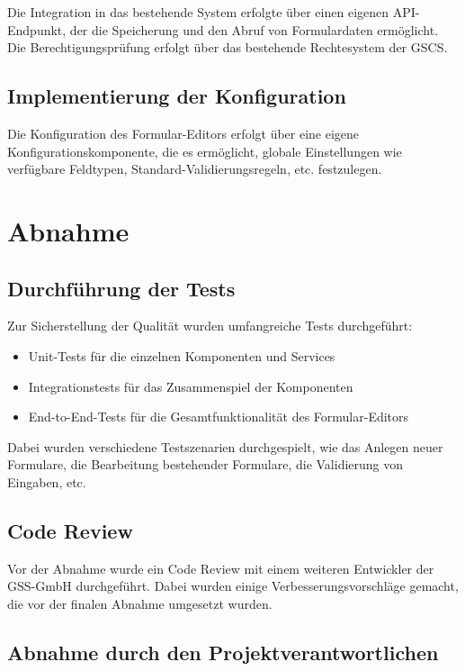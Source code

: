 \documentclass[a4paper,11pt]{article}
\begin{document}
Die Integration in das bestehende System erfolgte über einen eigenen API-Endpunkt, der die Speicherung und den Abruf von Formulardaten ermöglicht. Die Berechtigungsprüfung erfolgt über das bestehende Rechtesystem der GSCS.

\subsection{Implementierung der Konfiguration}

Die Konfiguration des Formular-Editors erfolgt über eine eigene Konfigurationskomponente, die es ermöglicht, globale Einstellungen wie verfügbare Feldtypen, Standard-Validierungsregeln, etc. festzulegen.

\section{Abnahme}

\subsection{Durchführung der Tests}

Zur Sicherstellung der Qualität wurden umfangreiche Tests durchgeführt:

\begin{itemize}
\item Unit-Tests für die einzelnen Komponenten und Services
\item Integrationstests für das Zusammenspiel der Komponenten
\item End-to-End-Tests für die Gesamtfunktionalität des Formular-Editors
\end{itemize}

Dabei wurden verschiedene Testszenarien durchgespielt, wie das Anlegen neuer Formulare, die Bearbeitung bestehender Formulare, die Validierung von Eingaben, etc.

\subsection{Code Review}

Vor der Abnahme wurde ein Code Review mit einem weiteren Entwickler der GSS-GmbH durchgeführt. Dabei wurden einige Verbesserungsvorschläge gemacht, die vor der finalen Abnahme umgesetzt wurden.

\subsection{Abnahme durch den Projektverantwortlichen}
\end{document}
